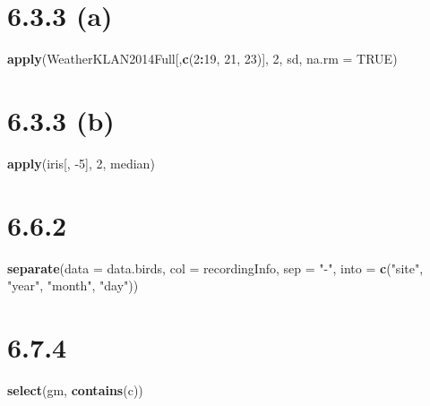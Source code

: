 \documentclass[
]{krantz}
\makeatletter
\newenvironment{Shaded}{\begin{snugshade}}{\end{snugshade}}
\newcommand{\DataTypeTok}[1]{\textcolor[rgb]{0.27,0.27,0.27}{#1}}
\newcommand{\DecValTok}[1]{\textcolor[rgb]{0.06,0.06,0.06}{#1}}
\newcommand{\KeywordTok}[1]{\textcolor[rgb]{0.27,0.27,0.27}{\textbf{#1}}}
\newcommand{\NormalTok}[1]{#1}
\newcommand{\OperatorTok}[1]{\textcolor[rgb]{0.43,0.43,0.43}{\textbf{#1}}}
\newcommand{\OtherTok}[1]{\textcolor[rgb]{0.37,0.37,0.37}{#1}}
\newcommand{\StringTok}[1]{\textcolor[rgb]{0.5,0.5,0.5}{#1}}
\newenvironment{kframe}{%
\medskip{}
\setlength{\fboxsep}{.8em}
 \def\at@end@of@kframe{}%
 \ifinner\ifhmode%
  \def\at@end@of@kframe{\end{minipage}}%
  \begin{minipage}{\columnwidth}%
 \fi\fi%
 \def\FrameCommand##1{\hskip\@totalleftmargin \hskip-\fboxsep
 \colorbox{shadecolor}{##1}\hskip-\fboxsep
     \hskip-\linewidth \hskip-\@totalleftmargin \hskip\columnwidth}%
 \MakeFramed {\advance\hsize-\width
   \@totalleftmargin\z@ \linewidth\hsize
   \@setminipage}}%
 {\par\unskip\endMakeFramed%
 \at@end@of@kframe}
\renewenvironment{Shaded}{\begin{kframe}}{\end{kframe}}
\makeatother
\begin{document}
\hypertarget{a}{%
\section*{6.3.3 (a)}\label{a}}


\begin{Shaded}
\begin{Highlighting}[]
\KeywordTok{apply}\NormalTok{(WeatherKLAN2014Full[,}\KeywordTok{c}\NormalTok{(}\DecValTok{2}\OperatorTok{:}\DecValTok{19}\NormalTok{, }\DecValTok{21}\NormalTok{, }\DecValTok{23}\NormalTok{)], }\DecValTok{2}\NormalTok{, sd, }\DataTypeTok{na.rm =} \OtherTok{TRUE}\NormalTok{)}
\end{Highlighting}
\end{Shaded}

\hypertarget{b}{%
\section*{6.3.3 (b)}\label{b}}


\begin{Shaded}
\begin{Highlighting}[]
\KeywordTok{apply}\NormalTok{(iris[, }\DecValTok{{-}5}\NormalTok{], }\DecValTok{2}\NormalTok{, median)}
\end{Highlighting}
\end{Shaded}

\hypertarget{section-5}{%
\section*{6.6.2}\label{section-5}}


\begin{Shaded}
\begin{Highlighting}[]
\KeywordTok{separate}\NormalTok{(}\DataTypeTok{data =}\NormalTok{ data.birds, }\DataTypeTok{col =}\NormalTok{ recordingInfo, }\DataTypeTok{sep =} \StringTok{"{-}"}\NormalTok{,}
	 \DataTypeTok{into =} \KeywordTok{c}\NormalTok{(}\StringTok{"site"}\NormalTok{, }\StringTok{"year"}\NormalTok{, }\StringTok{"month"}\NormalTok{, }\StringTok{"day"}\NormalTok{))}
\end{Highlighting}
\end{Shaded}

\hypertarget{section-6}{%
\section*{6.7.4}\label{section-6}}


\begin{Shaded}
\begin{Highlighting}[]
\KeywordTok{select}\NormalTok{(gm, }\KeywordTok{contains}\NormalTok{(}\StringTok{\textquotesingle{}c\textquotesingle{}}\NormalTok{))}
\end{Highlighting}
\end{Shaded}
\end{document}
